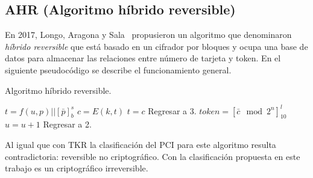 %
%

\subsection{AHR (Algoritmo híbrido reversible)}

En 2017, Longo, Aragona y Sala~\cite{aragona} propusieron un algoritmo que
denominaron \textit{híbrido reversible} que está basado en un cifrador por
bloques y ocupa una base de datos para almacenar las relaciones entre número
de tarjeta y token. En el siguiente pseudocódigo se describe el
funcionamiento general.


\begin{algorithm}
  \caption{\label{cod_ahr} Algoritmo híbrido reversible.}
  \begin{algorithmic}[1]
      \State $ t = f(u, p) || [\bar{p}]^s_b $
      \State $ c = E(k, t) $
        \State $ t = c $
        \State Regresar a 3.
      \EndIf
      \State $ token = {[\bar{c} \mod 2^n]}^l_{10} $
        \State $ u = u + 1 $
        \State Regresar a 2.
      \EndIf
      \State {}
    \EndFunction
  \end{algorithmic}
\end{algorithm}

Al igual que con TKR la clasificación del PCI para este algoritmo resulta
contradictoria: reversible no criptográfico. Con la clasificación propuesta
en este trabajo es un criptográfico irreversible.
